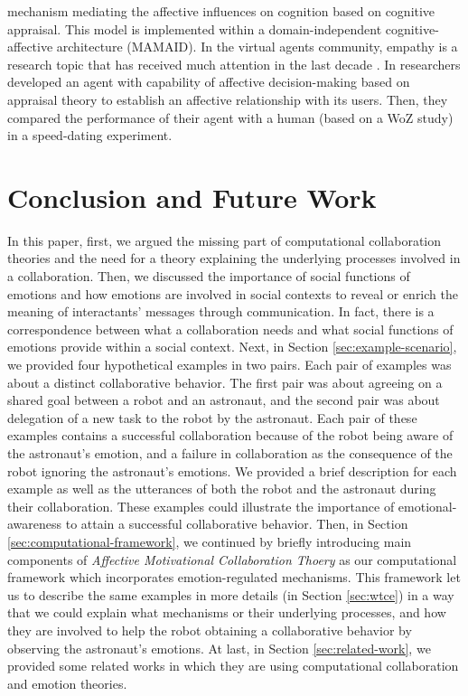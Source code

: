 mechanism mediating the affective influences on cognition based on cognitive
appraisal. This model is implemented within a domain-independent
cognitive-affective architecture (MAMAID). In the virtual agents community,
empathy is a research topic that has received much attention in the last decade
\cite{brave:emotion-hci} \cite{scott:modeling-empathy-agent}
\cite{paiva:agent-care} \cite{prendinger:empathic-companion}
\cite{bickmore:longterm-relationship}. In \cite{pontier:women-robot-men}
researchers developed an agent with capability of affective decision-making
based on appraisal theory to establish an affective relationship with its users.
Then, they compared the performance of their agent with a human (based on a WoZ
study) in a speed-dating experiment.

\section{Conclusion and Future Work}

In this paper, first, we argued the missing part of computational collaboration
theories and the need for a theory explaining the underlying processes involved
in a collaboration. Then, we discussed the importance of social functions of
emotions and how emotions are involved in social contexts to reveal or enrich
the meaning of interactants' messages through communication. In fact, there is a
correspondence between what a collaboration needs and what social functions of
emotions provide within a social context. Next, in Section
\ref{sec:example-scenario}, we provided four hypothetical examples in two pairs.
Each pair of examples was about a distinct collaborative behavior. The first
pair was about agreeing on a shared goal between a robot and an astronaut, and
the second pair was about delegation of a new task to the robot by the
astronaut. Each pair of these examples contains a successful collaboration
because of the robot being aware of the astronaut's emotion, and a failure in
collaboration as the consequence of the robot ignoring the astronaut's
emotions. We provided a brief description for each example as well as the
utterances of both the robot and the astronaut during their collaboration. These
examples could illustrate the importance of emotional-awareness to attain a
successful collaborative behavior. Then, in Section
\ref{sec:computational-framework}, we continued by briefly introducing main
components of \textit{Affective Motivational Collaboration Thoery} as our
computational framework which incorporates emotion-regulated mechanisms. This
framework let us to describe the same examples in more details (in Section
\ref{sec:wtce}) in a way that we could explain what mechanisms or their
underlying processes, and how they are involved to help the robot obtaining a
collaborative behavior by observing the astronaut's emotions. At last, in
Section \ref{sec:related-work}, we provided some related works in which they are
using computational collaboration and emotion theories.

